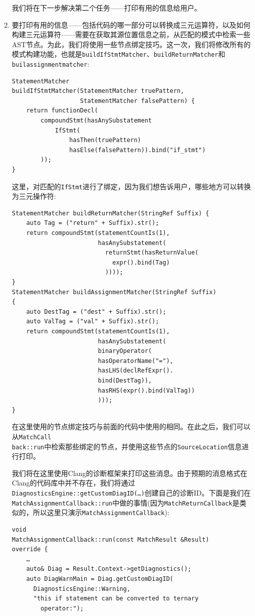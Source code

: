 \begin{enumerate}
我们将在下一步解决第二个任务——打印有用的信息给用户。

\item 要打印有用的信息——包括代码的哪一部分可以转换成三元运算符，以及如何构建三元运算符——需要在获取其源位置信息之前，从匹配的模式中检索一些AST节点。为此，我们将使用一些节点绑定技巧。这一次，我们将修改所有的模式构建功能，也就是\texttt{buildIfStmtMatcher}、\texttt{buildReturnMatcher}和\texttt{builassignmentmatcher}:

\begin{lstlisting}[style=styleCXX]
StatementMatcher
buildIfStmtMatcher(StatementMatcher truePattern,
				   StatementMatcher falsePattern) {
	return functionDecl(
		compoundStmt(hasAnySubstatement
			IfStmt(
				hasThen(truePattern)
				hasElse(falsePattern)).bind("if_stmt")
		));
}
\end{lstlisting}

这里，对匹配的\texttt{IfStmt}进行了绑定，因为我们想告诉用户，哪些地方可以转换为三元操作符:

\begin{lstlisting}[style=styleCXX]
StatementMatcher buildReturnMatcher(StringRef Suffix) {
	auto Tag = ("return" + Suffix).str();
	return compoundStmt(statementCountIs(1),
						hasAnySubstatement(
						  returnStmt(hasReturnValue(
						    expr().bind(Tag)
						  ))));
}
StatementMatcher buildAssignmentMatcher(StringRef Suffix)
{
	auto DestTag = ("dest" + Suffix).str();
	auto ValTag = ("val" + Suffix).str();
	return compoundStmt(statementCountIs(1),
						hasAnySubstatement(
						binaryOperator(
						hasOperatorName("="),
						hasLHS(declRefExpr().
						bind(DestTag)),
						hasRHS(expr().bind(ValTag))
						)));
}
\end{lstlisting}

在这里使用的节点绑定技巧与前面的代码中使用的相同。在此之后，我们可以从\texttt{MatchCall\\back::run}中检索那些绑定的节点，并使用这些节点的\texttt{SourceLocation}信息进行打印。

我们将在这里使用Clang的诊断框架来打印这些消息。由于预期的消息格式在Clang的代码库中并不存在，我们将通过\texttt{DiagnosticsEngine::getCustomDiagID(…)}创建自己的诊断ID。下面是我们在\texttt{MatchAssignmentCallback::run}中做的事情(因为\texttt{MatchReturnCallback}是类似的，所以这里只演示\texttt{MatchAssignmentCallback}):

\begin{lstlisting}[style=styleCXX]
void
MatchAssignmentCallback::run(const MatchResult &Result)
override {
	…
	auto& Diag = Result.Context->getDiagnostics();
	auto DiagWarnMain = Diag.getCustomDiagID(
	  DiagnosticsEngine::Warning,
	  "this if statement can be converted to ternary
	    operator:");
	    

\end{lstlisting}
\end{enumerate}
